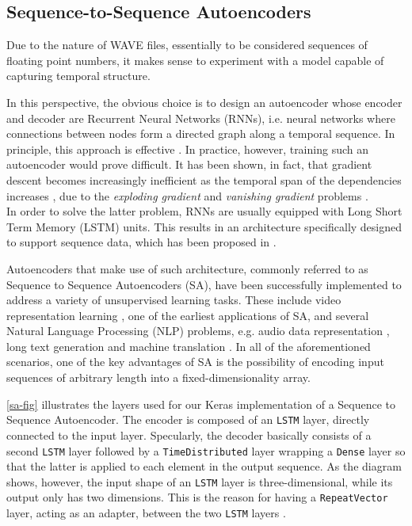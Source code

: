 \documentclass[11pt]{article}
\begin{document}
\subsection{Sequence-to-Sequence Autoencoders}  \label{seq2seq}
Due to the nature of WAVE files, essentially to be considered sequences of floating point numbers, it makes sense to experiment with a model capable of capturing temporal structure. \par
In this perspective, the obvious choice is to design an autoencoder whose encoder and decoder are Recurrent Neural Networks (RNNs), i.e. neural networks where connections between nodes form a directed graph along a temporal sequence. In principle, this approach is effective \cite{Sutskever.2014}. In practice, however, training such an autoencoder would prove difficult. It has been shown, in fact, that gradient descent becomes increasingly inefficient as the temporal span of the dependencies increases \cite{Bengio.1994}, due to the \textit{exploding gradient} and \textit{vanishing gradient} problems \cite{Pascanu.2012}.\\
In order to solve the latter problem, RNNs are usually equipped with Long Short Term Memory (LSTM) units. This results in an architecture specifically designed to support sequence data, which has been proposed in \cite{Hochreiter.1997}.\par
Autoencoders that make use of such architecture, commonly referred to as Sequence to Sequence Autoencoders (SA), have been successfully implemented to address a variety of unsupervised learning tasks.
These include video representation learning \cite{Srivastava.2015}, one of the earliest applications of SA, and several Natural Language Processing (NLP) problems, e.g. audio data representation \cite{Yu.2016}, long text generation \cite{Jiwei.2015} and machine translation \cite{Sutskever.2014}. In all of the aforementioned scenarios, one of the key advantages of SA is the possibility of encoding input sequences of arbitrary length into a fixed-dimensionality array.\par
\autoref{sa-fig} illustrates the layers used for our Keras implementation of a Sequence to Sequence Autoencoder. The encoder is composed of an \texttt{LSTM} layer, directly connected to the input layer. Specularly, the decoder basically consists of a second \texttt{LSTM} layer followed by a \texttt{TimeDistributed} layer wrapping a \texttt{Dense} layer so that the latter is applied to each element in the output sequence. As the diagram shows, however, the input shape of an \texttt{LSTM} layer is three-dimensional, while its output only has two dimensions. This is the reason for having a \texttt{RepeatVector} layer, acting as an adapter, between the two \texttt{LSTM} layers \cite{Chollet.2015}.
\end{document}
